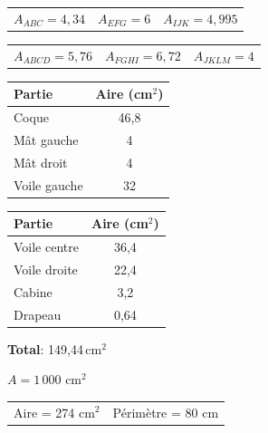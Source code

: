 \vfill
 
\vspace{-10pt}\begin{tabularx}{\textwidth}{XXX}
$A_{ABC} = 4{,}34$ & $A_{EFG} = 6$ & $A_{IJK} = 4{,}995$ \\
\end{tabularx}
 
\vspace{20pt}
\vspace{-10pt}\begin{tabularx}{\textwidth}{XXX}
$A_{ABCD} = 5{,}76$ & $A_{FGHI} = 6{,}72$ & $A_{JKLM} = 4$ \\
\end{tabularx}
 
\newpage
{}
\vspace{-5pt}
{\small
\renewcommand{\arraystretch}{1.3}
\begin{tabularx}{0.45\textwidth}{l|C}
Partie & Aire (cm$^2$) \\
\hline
Coque        & 46,8 \\
Mât gauche   & 4 \\
Mât droit    & 4 \\
Voile gauche & 32 \\
\hline
\end{tabularx}\hfill
\begin{tabularx}{0.45\textwidth}{l|C}
Partie & Aire (cm$^2$) \\
\hline
Voile centre & 36,4 \\
Voile droite & 22,4 \\
Cabine       & 3,2 \\
Drapeau      & 0,64 \\
\hline
\end{tabularx}\hfill
\renewcommand{\arraystretch}{1}

\vspace{5pt}\textbf{Total}: 149,44\,cm$^2$}

 
\vspace{20pt}
\vspace{-10pt}$A = 1\,000$ cm$^2$
 
\vspace{20pt}
\vspace{-10pt}\begin{tabularx}{\textwidth}{XX}
Aire = 274 cm$^2$ & Périmètre = 80 cm \\
\end{tabularx}
 
